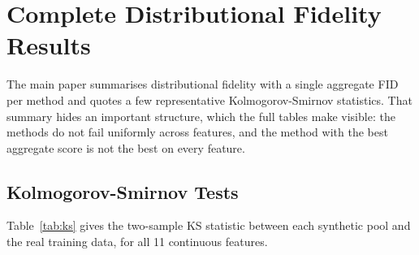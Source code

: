 \documentclass[journal,onecolumn]{IEEEtran}
\begin{document}
\section{Complete Distributional Fidelity Results}

The main paper summarises distributional fidelity with a single aggregate FID per method and quotes a few representative Kolmogorov-Smirnov statistics. That summary hides an important structure, which the full tables make visible: the methods do not fail uniformly across features, and the method with the best aggregate score is not the best on every feature.

\subsection{Kolmogorov-Smirnov Tests}

Table~\ref{tab:ks} gives the two-sample KS statistic between each synthetic pool and the real training data, for all 11 continuous features.

\begin{table}[!t]
  \centering
  \caption{Two-Sample Kolmogorov-Smirnov Statistics Against Real Training Data. Lower is Better. An Asterisk Marks a Statistically Significant Difference at $\alpha = 0.05$}
  \label{tab:ks}
\end{table}
\end{document}
